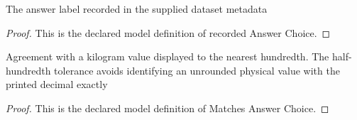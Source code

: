 \begin{definition}
  \label{def:physics:phyx-mini-0242:phyxminiproblems-problemphyxmini0242-recordedanswerchoice}
  The answer label recorded in the supplied dataset metadata
\end{definition}
\begin{proof}
  This is the declared model definition of recorded Answer Choice.
\end{proof}
\begin{definition}
  \label{def:physics:phyx-mini-0242:phyxminiproblems-problemphyxmini0242-matchesanswerchoice}
  Agreement with a kilogram value displayed to the nearest hundredth. The half-hundredth tolerance avoids identifying an unrounded physical value with the printed decimal exactly
\end{definition}
\begin{proof}
  This is the declared model definition of Matches Answer Choice.
\end{proof}
